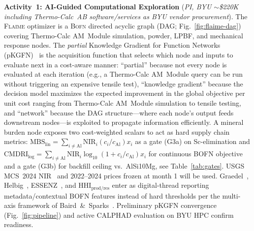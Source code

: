 \documentclass[11pt,letterpaper]{article}
\newcommand{\flaime}{\textsc{Flaime}}
\newcommand{\bofn}{\textsc{Bofn}}
\begin{document}
\textbf{Activity~1: AI-Guided Computational Exploration}
(\emph{PI, BYU {$\sim$}\$220K including Thermo-Calc~AB software/services as BYU vendor procurement}).
%
The \flaime{} optimizer is a \bofn{} directed acyclic graph
(DAG; Fig.~\ref{fig:flaime-dag})~\cite{sundar_2025_s4357802,paramore_2025_jactamat} covering
Thermo-Calc AM~Module simulation, powder, LPBF, and mechanical response nodes.
The \emph{partial} Knowledge Gradient for Function
Networks (pKGFN)~\cite{buathong_2023_23110214,buathong_2025_25061145}
is the acquisition function that selects which node and inputs to
evaluate next in a cost-aware manner: ``partial'' because not every
node is evaluated at each iteration (e.g., a Thermo-Calc AM~Module
query can be run without triggering an expensive tensile test),
``knowledge gradient'' because the decision model maximizes the expected
improvement in the global objective per unit cost
ranging from Thermo-Calc AM~Module simulation to tensile testing, and
``network'' because the DAG structure---where each node's output feeds downstream nodes---is exploited to propagate information efficiently.
A mineral burden node
exposes two cost-weighted
scalars to act as hard supply chain metrics: $\mathrm{MBS}_{\text{lin}}{=}\sum_{i\neq\mathrm{Al}}\mathrm{NIR}_i(c_i/c_{\mathrm{Al}})x_i$
as a gate (G3a) on Sc-elimination and $\mathrm{CMDRI}_{\text{log}}{=}\sum_{i\neq\mathrm{Al}}\mathrm{NIR}_i\log_{10}(1+c_i/c_{\mathrm{Al}})x_i$
for continuous BOFN objective and a gate (G3b) for backfill ceiling vs.\ AlSi10Mg, see
Table~\ref{tab:gates}. USGS MCS~2024 NIR~\cite{usgs_mcs_2024}
and 2022--2024 prices frozen at month 1
will be used. Graedel~\cite{graedel_2012_es203534}, Helbig~\cite{mulukutla_2024_ssrn4968},
ESSENZ~\cite{cimprich_2019_jiec1286}, and $\mathrm{HHI}_{\text{prod/res}}$
enter as digital-thread reporting metadata/contextual BOFN features instead of hard thresholds
per the multi-axis framework of Baird~\&~Sparks~\cite{titirici_2022_roadmap}.
Preliminary pKGFN convergence (Fig.~\ref{fig:pipeline}) and active
CALPHAD evaluation on BYU HPC confirm readiness.
\end{document}
